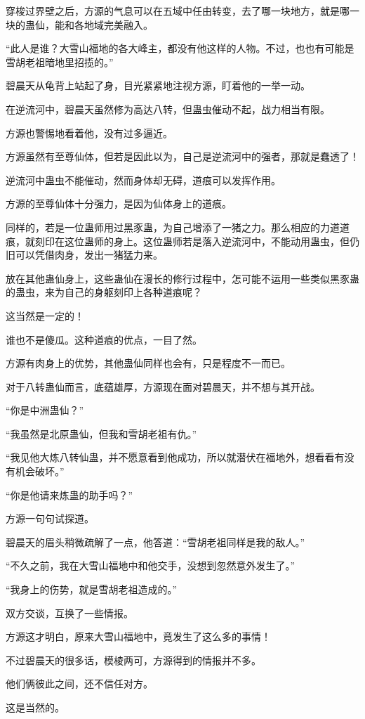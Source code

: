 \begin{this_body}
穿梭过界壁之后，方源的气息可以在五域中任由转变，去了哪一块地方，就是哪一块的蛊仙，能和各地域完美融入。

“此人是谁？大雪山福地的各大峰主，都没有他这样的人物。不过，也也有可能是雪胡老祖暗地里招揽的。”

碧晨天从龟背上站起了身，目光紧紧地注视方源，盯着他的一举一动。

在逆流河中，碧晨天虽然修为高达八转，但蛊虫催动不起，战力相当有限。

方源也警惕地看着他，没有过多逼近。

方源虽然有至尊仙体，但若是因此以为，自己是逆流河中的强者，那就是蠢透了！

逆流河中蛊虫不能催动，然而身体却无碍，道痕可以发挥作用。

方源的至尊仙体十分强力，是因为仙体身上的道痕。

同样的，若是一位蛊师用过黑豕蛊，为自己增添了一猪之力。那么相应的力道道痕，就刻印在这位蛊师的身上。这位蛊师若是落入逆流河中，不能动用蛊虫，但仍旧可以凭借肉身，发出一猪猛力来。

放在其他蛊仙身上，这些蛊仙在漫长的修行过程中，怎可能不运用一些类似黑豕蛊的蛊虫，来为自己的身躯刻印上各种道痕呢？

这当然是一定的！

谁也不是傻瓜。这种道痕的优点，一目了然。

方源有肉身上的优势，其他蛊仙同样也会有，只是程度不一而已。

对于八转蛊仙而言，底蕴雄厚，方源现在面对碧晨天，并不想与其开战。

“你是中洲蛊仙？”

“我虽然是北原蛊仙，但我和雪胡老祖有仇。”

“我见他大炼八转仙蛊，并不愿意看到他成功，所以就潜伏在福地外，想看看有没有机会破坏。”

“你是他请来炼蛊的助手吗？”

方源一句句试探道。

碧晨天的眉头稍微疏解了一点，他答道：“雪胡老祖同样是我的敌人。”

“不久之前，我在大雪山福地中和他交手，没想到忽然意外发生了。”

“我身上的伤势，就是雪胡老祖造成的。”

双方交谈，互换了一些情报。

方源这才明白，原来大雪山福地中，竟发生了这么多的事情！

不过碧晨天的很多话，模棱两可，方源得到的情报并不多。

他们俩彼此之间，还不信任对方。

这是当然的。


\end{this_body}
